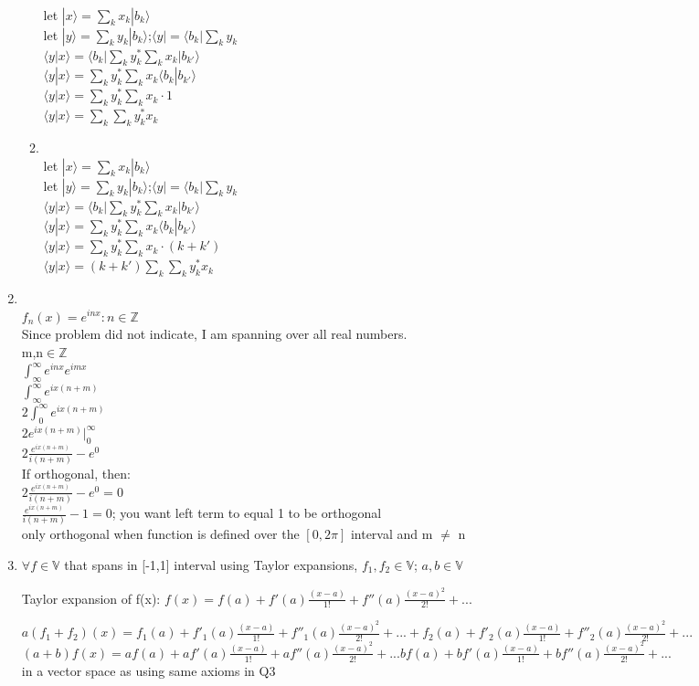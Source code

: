 \documentclass{article}
\begin{document}
\begin{enumerate}
\begin{enumerate}
\\ let $|x\rangle = \sum_k x_k|b_k\rangle$
\\ let $|y\rangle = \sum_k y_k|b_k\rangle $;\quad $\langle y| =\langle b_k|\sum_k y_k$
\\ $\langle y|x \rangle = \langle b_k|\sum_k y_k^* \sum_k x_k|b_{k'}\rangle$
\\ $\langle y|x \rangle = \sum_k y_k^* \sum_k x_k \langle b_k|b_{k'}\rangle $
\\ $\langle y|x \rangle = \sum_k y_k^* \sum_k x_k \cdot 1$
\\ $\langle y|x \rangle = \sum_k\sum_k y_k^* x_k$ 
\item
\\ let $|x\rangle = \sum_k x_k|b_k\rangle$
\\ let $|y\rangle = \sum_k y_k|b_k\rangle $;\quad $\langle y| =\langle b_k|\sum_k y_k$
\\ $\langle y|x \rangle = \langle b_k|\sum_k y_k^* \sum_k x_k|b_{k'}\rangle$
\\ $\langle y|x \rangle = \sum_k y_k^* \sum_k x_k \langle b_k|b_{k'}\rangle $
\\ $\langle y|x \rangle = \sum_k y_k^* \sum_k x_k \cdot (k+k')$
\\ $\langle y|x \rangle = (k+k')\sum_k\sum_k y_k^* x_k$ 
\end{enumerate}
\item
\\$f_n(x)=e^{inx}:n\in\mathbb{Z}$
\\Since problem did not indicate, I am spanning over all real numbers.
\\ m,n$\in\mathbb{Z}$
\\$\int_\infty^\infty e^{inx}e^{imx}$
\\$\int_\infty^\infty e^{ix(n+m)}$
\\ $2 \int_0^\infty e^{ix(n+m)}$
\\ $2e^{ix(n+m)}|_0^\infty$
\\ $2\frac{e^{ix(n+m)}}{i(n+m)}-e^0$
\\ If orthogonal, then: 
\\ $2\frac{e^{ix(n+m)}}{i(n+m)}-e^0=0$
\\ $\frac{e^{ix(n+m)}}{i(n+m)}-1=0$; you want left term to equal 1 to be orthogonal
\\ only orthogonal when function is defined over the $[0,2\pi]$ interval and m $\neq$ n
\item $\forall f \in \mathbb{V}$ that spans in [-1,1] interval using Taylor expansions, $f_1,f_2 \in \mathbb{V}$; $a, b \in \mathbb{V}$

Taylor expansion of f(x):
$f(x)=f(a)+f'(a)\frac{(x-a)}{1!}+f''(a)\frac{(x-a)^2}{2!}+...$

$a(f_1+f_2)(x)=f_1(a)+f'_1(a)\frac{(x-a)}{1!}+f''_1(a)\frac{(x-a)^2}{2!}+...+ f_2(a)+f'_2(a)\frac{(x-a)}{1!}+f''_2(a)\frac{(x-a)^2}{2!}+...$
\\$(a+b)f(x)=af(a)+af'(a)\frac{(x-a)}{1!}+af''(a)\frac{(x-a)^2}{2!}+...bf(a)+bf'(a)\frac{(x-a)}{1!}+bf''(a)\frac{(x-a)^2}{2!}+...$
\\in a vector space as using same axioms in Q3

\end{enumerate}%
\end{document}
